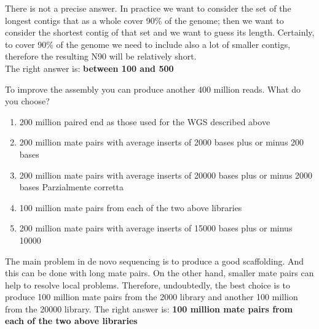 \begin{Answer} [
  ref={ex37},
  number={1}
 ]

\Question There is not a precise answer.  In practice we want to consider the
set of  the longest contigs that as a whole cover 90\% of the genome; then we
want to consider the shortest contig of that set and we want to guess its
length. Certainly, to cover 90\% of the genome we need to include also a lot of
smaller contigs, therefore the resulting N90 will be relatively short.\\
The right answer is: \textbf{between 100 and 500}

\end{Answer}

\begin{Exercise} [
  label={ex38},
  origin={G. Valle}
 ]

\Question To improve the assembly you can produce another 400 million reads.
What do you choose?
\begin{enumerate}
\item 200 million paired end as those used for the WGS described above
\item 200 million mate pairs with average inserts of 2000 bases plus or minus
200 bases
\item 200 million mate pairs with average inserts of 20000 bases plus or minus
2000 bases Parzialmente corretta
\item 100 million mate pairs from each of the two above libraries
\item 200 million mate pairs with average inserts of 15000 bases plus or minus
10000
\end{enumerate}

\end{Exercise}

\begin{Answer} [
  ref={ex38},
  number={1}
 ]

\Question The main problem in de novo sequencing  is to produce a good
scaffolding. And this can be done with long mate pairs. On the other hand,
smaller mate pairs can help to resolve local problems. Therefore, undoubtedly,
the best choice is to produce 100 million mate pairs from the 2000 library and
another 100 million from the 20000 library.
The right answer is: \textbf{100 million mate pairs from each of the two above
libraries}

\end{Answer}

